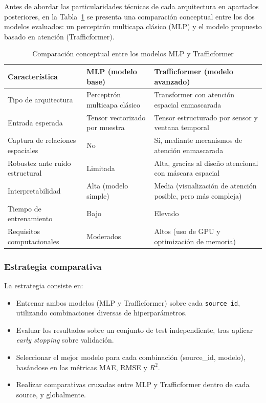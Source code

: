 Antes de abordar las particularidades técnicas de cada arquitectura en apartados posteriores, en la Tabla~\ref{tab:mlp_vs_trafficformer} se presenta una comparación conceptual entre los dos modelos evaluados: un perceptrón multicapa clásico (MLP) y el modelo propuesto basado en atención (Trafficformer).

\begin{table}[H]
	\centering
	\caption{Comparación conceptual entre los modelos MLP y Trafficformer}
	\label{tab:mlp_vs_trafficformer}
	\begin{tabularx}{\textwidth}{lXX}
		\toprule
		\textbf{Característica} & \textbf{MLP (modelo base)} & \textbf{Trafficformer (modelo avanzado)} \\
		\midrule
		Tipo de arquitectura & Perceptrón multicapa clásico & Transformer con atención espacial enmascarada \\
		Entrada esperada & Tensor vectorizado por muestra & Tensor estructurado por sensor y ventana temporal \\
		Captura de relaciones espaciales & No & Sí, mediante mecanismos de atención enmascarada \\
		Robustez ante ruido estructural & Limitada & Alta, gracias al diseño atencional con máscara espacial \\
		Interpretabilidad & Alta (modelo simple) & Media (visualización de atención posible, pero más compleja) \\
		Tiempo de entrenamiento & Bajo & Elevado \\
		Requisitos computacionales & Moderados & Altos (uso de GPU y optimización de memoria) \\
		\bottomrule
	\end{tabularx}
\end{table}

\subsubsection{Estrategia comparativa}

La estrategia consiste en:

\begin{itemize}
	\item Entrenar ambos modelos (MLP y Trafficformer) sobre cada \texttt{source\_id}, utilizando combinaciones diversas de hiperparámetros.
	\item Evaluar los resultados sobre un conjunto de test independiente, tras aplicar \textit{early stopping} sobre validación.
	\item Seleccionar el mejor modelo para cada combinación (source\_id, modelo), basándose en las métricas MAE, RMSE y $R^2$.
	\item Realizar comparativas cruzadas entre MLP y Trafficformer dentro de cada source, y globalmente.
\end{itemize}

